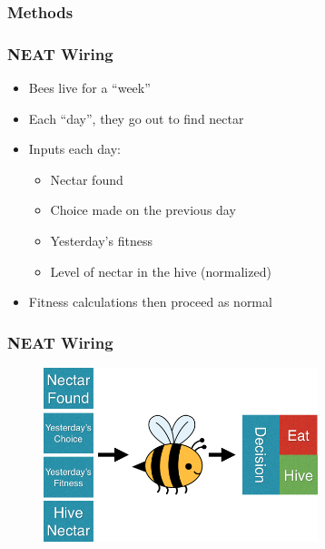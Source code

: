 \documentclass{beamer}
\begin{document}
      \subsubsection{Methods} %
      \label{ssub:methods}
        \begin{frame}[c]\frametitle{NEAT Wiring}
            
          \begin{itemize}
            \item Bees live for a ``week''
            \item Each ``day'', they go out to find nectar
            \bigskip
            \item Inputs each day:
            \begin{itemize}
                \item Nectar found
                \item Choice made on the previous day
                \item Yesterday's fitness
                \item Level of nectar in the hive (normalized)
            \end{itemize}
            \item Fitness calculations then proceed as normal

          \end{itemize}
        
        \end{frame}
        \begin{frame}[t]\frametitle{NEAT Wiring}
          \begin{figure}
          \includegraphics[width=8cm]{bee_diagrams/recurrent_system.png}
          \end{figure}
        \end{frame}
\end{document}
